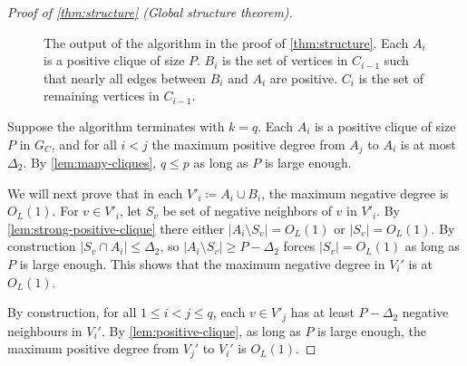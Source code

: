 \documentclass[reqno, 11pt]{amsart}
\theoremstyle{definition}
\theoremstyle{remark}
\begin{document}
\begin{proof}[Proof of \cref{thm:structure} (Global structure theorem)]
\begin{figure}[h]
    \caption{The output of the algorithm in the proof of \cref{thm:structure}. Each $A_i$ is a positive clique of size $P$. $B_i$ is the set of vertices in $C_{i-1}$ such that nearly all edges between $B_i$ and $A_i$ are positive. $C_{i}$ is the set of remaining vertices in $C_{i-1}$.}
\end{figure}
    Suppose the algorithm terminates with $k = q$. Each $A_i$ is a positive clique of size $P$ in $G_C$, and for all $i < j$ the maximum positive degree from $A_j$ to $A_i$ is at most $\Delta_2$. By \cref{lem:many-cliques}, $q \leq p$ as long as $P$ is large enough.

We will next prove that in each $V'_i \coloneqq A_i \cup B_i$, the maximum negative degree is $O_L(1)$. For $v \in V'_i$, let $S_v$ be set of negative neighbors of $v$ in $V'_i$. By \cref{lem:strong-positive-clique} there either $|A_i \setminus S_v| = O_L(1)$ or  $|S_v| = O_L(1)$.  By construction $|S_v \cap A_i| \leq \Delta_2$, so $|A_i \setminus S_v| \geq P - \Delta_2$ forces $|S_v| = O_L(1)$ as long as $P$ is large enough. This shows that the maximum negative degree in $V_i'$ is at $O_L(1)$.

By construction, for all $1 \leq i < j \leq q$, each $v \in V'_j$ has at least $P - \Delta_2$ negative neighbours in $V_i'$. By \cref{lem:positive-clique}, as long as $P$ is large enough, the maximum positive degree from $V_j'$ to $V_i'$ is $O_L(1)$.



\end{proof}
\end{document}
